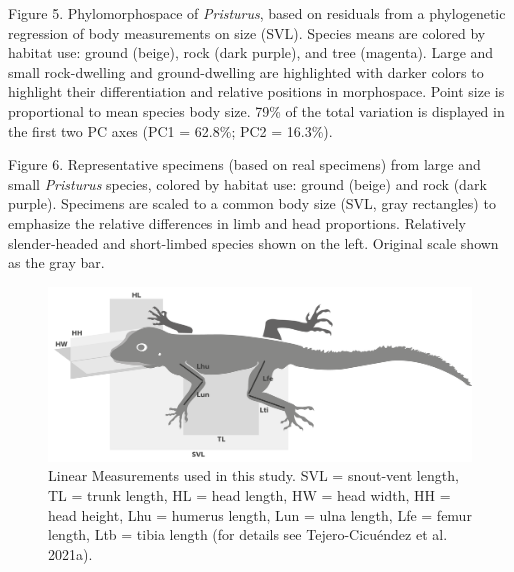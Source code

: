 \documentclass[
  11pt,
]{article}
\begin{document}
Figure 5. Phylomorphospace of \emph{Pristurus}, based on residuals from
a phylogenetic regression of body measurements on size (SVL). Species
means are colored by habitat use: ground (beige), rock (dark purple),
and tree (magenta). Large and small rock-dwelling and ground-dwelling
are highlighted with darker colors to highlight their differentiation
and relative positions in morphospace. Point size is proportional to
mean species body size. 79\% of the total variation is displayed in the
first two PC axes (PC1 = 62.8\%; PC2 = 16.3\%).

Figure 6. Representative specimens (based on real specimens) from large
and small \textit{Pristurus} species, colored by habitat use: ground
(beige) and rock (dark purple). Specimens are scaled to a common body
size (SVL, gray rectangles) to emphasize the relative differences in
limb and head proportions. Relatively slender-headed and short-limbed
species shown on the left. Original scale shown as the gray bar.

\newpage

\begin{figure}

{\centering \includegraphics[width=1\linewidth]{Figs/Fig1} 

}

\caption{Linear Measurements used in this study. SVL = snout-vent length, TL = trunk length, HL = head length, HW = head width, HH = head height, Lhu = humerus length, Lun = ulna length, Lfe = femur length, Ltb = tibia length (for details see Tejero-Cicu{\'{e}}ndez et al. 2021a).}\label{fig:unnamed-chunk-5}
\end{figure}

\newpage
\end{document}
